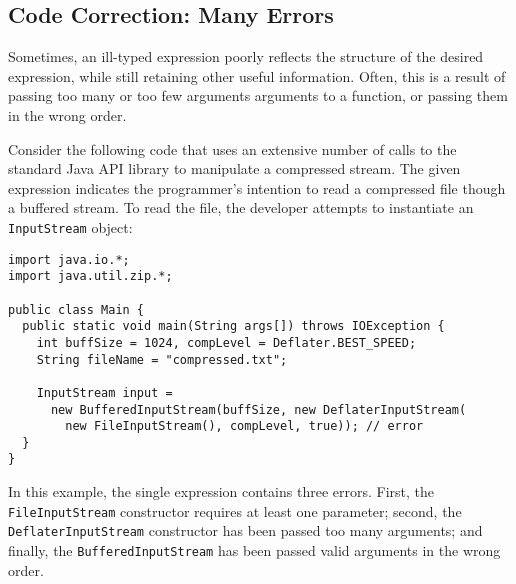 \subsection{Code Correction: Many Errors}
\label{sec:examples:many}
Sometimes, an ill-typed expression poorly reflects the structure of the desired expression, while still retaining other useful information. Often, this is a result of passing too many or too few arguments arguments to a function, or passing them in the wrong order.

Consider the following code that uses an extensive number of calls to the standard Java API library to manipulate a compressed stream. The given expression indicates the programmer's intention to read a compressed file though a buffered stream. To read the file, the developer attempts to instantiate an \lstinline{InputStream} object:
\begin{lstlisting}
import java.io.*;
import java.util.zip.*;

public class Main {
  public static void main(String args[]) throws IOException {
    int buffSize = 1024, compLevel = Deflater.BEST_SPEED;
    String fileName = "compressed.txt";
    
    InputStream input = 
      new BufferedInputStream(buffSize, new DeflaterInputStream(
        new FileInputStream(), compLevel, true)); // error 
  }
}
\end{lstlisting}
In this example, the single expression contains three errors. First, the \lstinline{FileInputStream} constructor requires at least one parameter; second, the \lstinline{DeflaterInputStream} constructor has been passed too many arguments; and finally, the \lstinline{BufferedInputStream} has been passed valid arguments in the wrong order.

